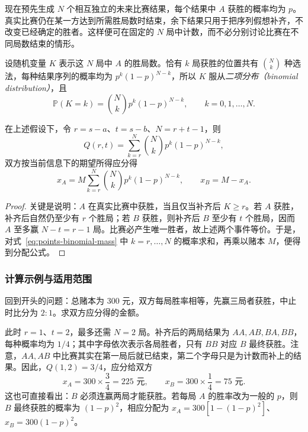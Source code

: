 \documentclass[UTF8,12pt,a4paper,fontset=fandol]{ctexbook}
\begin{document}
现在预先生成 $N$ 个相互独立的未来比赛结果，每个结果中 $A$ 获胜的概率均为 $p$。真实比赛仍在某一方达到所需胜局数时结束，余下结果只用于把序列假想补齐，不改变已经确定的胜者。这样便可在固定的 $N$ 局中计数，而不必分别讨论比赛在不同局数结束的情形。

设随机变量 $K$ 表示这 $N$ 局中 $A$ 的胜局数。恰有 $k$ 局获胜的位置共有 $\binom Nk$ 种选法，每种结果序列的概率均为 $p^k(1-p)^{N-k}$，所以 $K$ 服从\emph{二项分布（binomial distribution）}，且
\begin{equation}
  \mathbb P(K=k)=\binom Nk p^k(1-p)^{N-k},
  \qquad k=0,1,\ldots,N.
  \label{eq:points-binomial-mass}
\end{equation}

\begin{proposition}
\label{prop:points-general-shares}
在上述假设下，令 $r=s-a$、$t=s-b$、$N=r+t-1$，则
\begin{equation}
  Q(r,t)=\sum_{k=r}^{N}\binom Nk p^k(1-p)^{N-k},
  \label{eq:points-binomial-tail}
\end{equation}
双方按当前信息下的期望所得应分得
\begin{equation}
  x_A=M\sum_{k=r}^{N}\binom Nk p^k(1-p)^{N-k},
  \qquad x_B=M-x_A.
  \label{eq:points-general-shares}
\end{equation}
\end{proposition}

\begin{proof}
关键是说明：$A$ 在真实比赛中获胜，当且仅当补齐后 $K\ge r$。若 $A$ 获胜，补齐后自然仍至少有 $r$ 个胜局；若 $B$ 获胜，则补齐后 $B$ 至少有 $t$ 个胜局，因而 $A$ 至多赢 $N-t=r-1$ 局。比赛必产生唯一胜者，故上述两个事件等价。于是，对式~\eqref{eq:points-binomial-mass} 中 $k=r,\ldots,N$ 的概率求和，再乘以赌本 $M$，便得到分配公式。
\end{proof}

\subsubsection{计算示例与适用范围}
\label{subsubsec:points-examples}

\begin{example}
\label{ex:points-original}
回到开头的问题：总赌本为 $300$ 元，双方每局胜率相等，先赢三局者获胜，中止时比分为 $2:1$。求双方应分得的金额。
\end{example}

\begin{solve}
此时 $r=1$、$t=2$，最多还需 $N=2$ 局。补齐后的两局结果为 $AA,AB,BA,BB$，每种概率均为 $1/4$；其中字母依次表示各局胜者，只有 $BB$ 对应 $B$ 最终获胜。注意，$AA,AB$ 中比赛其实在第一局后就已结束，第二个字母只是为计数而补上的结果。因此，$Q(1,2)=3/4$，应分给双方
\[
  x_A=300\times\frac34=225\text{ 元},\qquad
  x_B=300\times\frac14=75\text{ 元}.
\]
这也可直接看出：$B$ 必须连赢两局才能获胜。若每局 $A$ 的胜率改为一般的 $p$，则 $B$ 最终获胜的概率为 $(1-p)^2$，相应分配为 $x_A=300[1-(1-p)^2]$、$x_B=300(1-p)^2$。
\end{solve}
\end{document}
